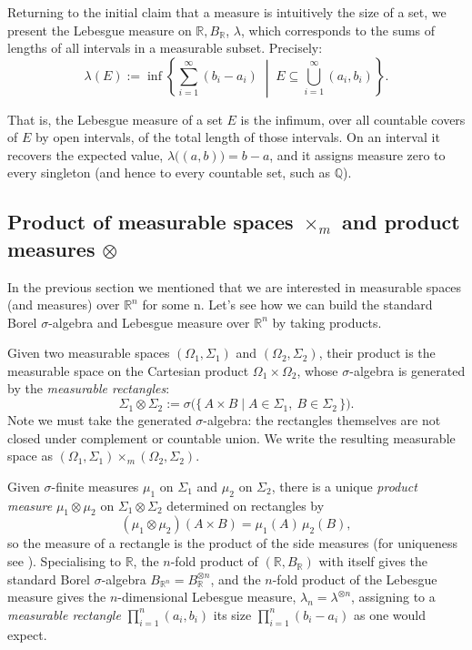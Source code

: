 Returning to the initial claim that a measure is intuitively the size of a set, we present the Lebesgue measure on $\mathbb{R}, B_\mathbb{R}$, $\lambda$, which corresponds to the sums of lengths of all
intervals in a measurable subset. Precisely:
\[
\lambda(E) := \inf \left\{
\sum_{i=1}^{\infty} (b_i - a_i)
\;\middle|\;
E \subseteq \bigcup_{i=1}^{\infty} (a_i, b_i)
\right\}.
\]

That is, the Lebesgue measure of a set $E$ is the infimum, over all countable covers of $E$ by open intervals, of the
total length of those intervals. On an interval it recovers the expected value, $\lambda\big((a, b)\big) = b - a$, and it
assigns measure zero to every singleton (and hence to every countable set, such as $\mathbb{Q}$).

\subsection{Product of measurable spaces $\times_m$ and product measures $\otimes$}
In the previous section we mentioned that we are interested in measurable spaces (and measures) over $\mathbb{R}^n$ for some n. Let's see how we can build the
standard Borel $\sigma$-algebra and Lebesgue measure over $\mathbb{R}^n$ by taking products.

Given two measurable spaces $(\Omega_1, \Sigma_1)$ and $(\Omega_2, \Sigma_2)$, their product is the measurable space on the Cartesian
product $\Omega_1 \times \Omega_2$, whose $\sigma$-algebra is generated by the \emph{measurable rectangles}:
\[
\Sigma_1 \otimes \Sigma_2 := \sigma\big(\{\, A \times B \mid A \in \Sigma_1,\ B \in \Sigma_2 \,\}\big).
\]
Note we must take the generated $\sigma$-algebra: the rectangles themselves are not closed under complement or countable union. We
write the resulting measurable space as $(\Omega_1, \Sigma_1) \times_m (\Omega_2, \Sigma_2)$.

Given $\sigma$-finite measures $\mu_1$ on $\Sigma_1$ and $\mu_2$ on $\Sigma_2$, there is a unique \emph{product measure}
$\mu_1 \otimes \mu_2$ on $\Sigma_1 \otimes \Sigma_2$ determined on rectangles by
\[
(\mu_1 \otimes \mu_2)(A \times B) = \mu_1(A)\,\mu_2(B),
\]
so the measure of a rectangle is the product of the side measures (for uniqueness see \citet[Chapter 5A]{axler}). Specialising to $\mathbb{R}$, the $n$-fold product of $(\mathbb{R}, B_\mathbb{R})$ with itself gives the standard Borel
$\sigma$-algebra $B_{\mathbb{R}^n} = B_\mathbb{R}^{\otimes n}$, and the $n$-fold product of the Lebesgue measure gives the
$n$-dimensional Lebesgue measure, $\lambda_n = \lambda^{\otimes n}$, assigning to a \emph{measurable rectangle} $\prod_{i=1}^n (a_i, b_i)$ its size
$\prod_{i=1}^n (b_i - a_i)$ as one would expect.

